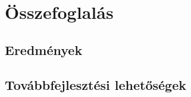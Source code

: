 \chapter{Összefoglalás}
\label{ch:osszefoglalas}

\section{Eredmények}

\section{Továbbfejlesztési lehetőségek}
